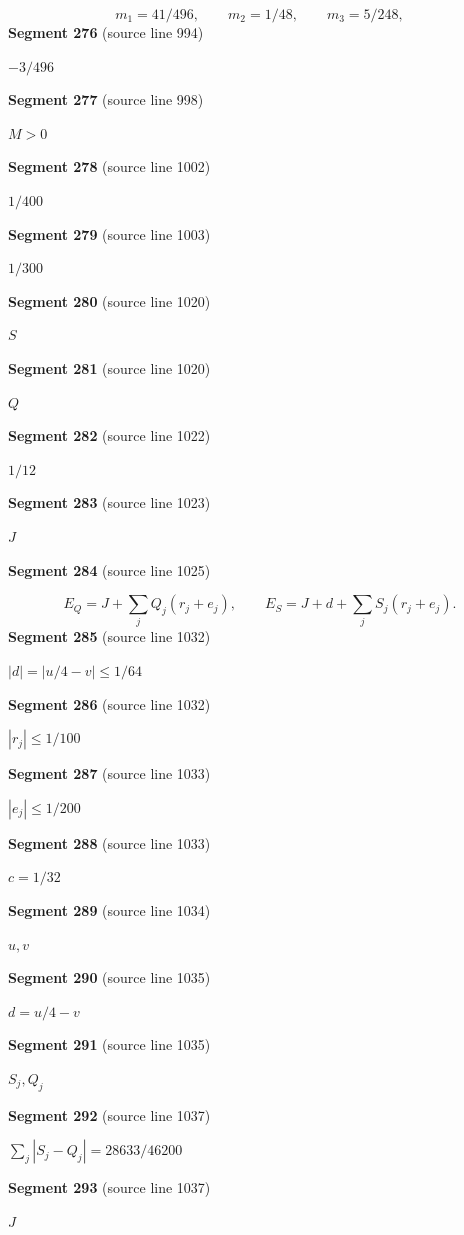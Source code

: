 \documentclass[11pt]{article}
\begin{document}
\[
m_1=41/496,\qquad m_2=1/48,\qquad m_3=5/248,
\]
\textbf{Segment 276} (source line 994)\par
\( -3/496 \)\par
\textbf{Segment 277} (source line 998)\par
\( M>0 \)\par
\textbf{Segment 278} (source line 1002)\par
\( 1/400 \)\par
\textbf{Segment 279} (source line 1003)\par
\( 1/300 \)\par
\textbf{Segment 280} (source line 1020)\par
\( S \)\par
\textbf{Segment 281} (source line 1020)\par
\( Q \)\par
\textbf{Segment 282} (source line 1022)\par
\( 1/12 \)\par
\textbf{Segment 283} (source line 1023)\par
\( J \)\par
\textbf{Segment 284} (source line 1025)\par
\[
E_Q=J+\sum_j Q_j(r_j+e_j),\qquad
E_S=J+d+\sum_j S_j(r_j+e_j).
\tag{21}
\]
\textbf{Segment 285} (source line 1032)\par
\( |d|=|u/4-v|\le1/64 \)\par
\textbf{Segment 286} (source line 1032)\par
\( |r_j|\le1/100 \)\par
\textbf{Segment 287} (source line 1033)\par
\( |e_j|\le1/200 \)\par
\textbf{Segment 288} (source line 1033)\par
\( c=1/32 \)\par
\textbf{Segment 289} (source line 1034)\par
\( u,v \)\par
\textbf{Segment 290} (source line 1035)\par
\( d=u/4-v \)\par
\textbf{Segment 291} (source line 1035)\par
\( S_j,Q_j \)\par
\textbf{Segment 292} (source line 1037)\par
\( \sum_j|S_j-Q_j|=28633/46200 \)\par
\textbf{Segment 293} (source line 1037)\par
\( J \)\par
\end{document}
